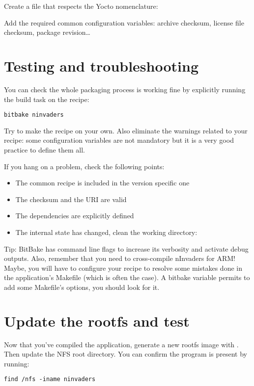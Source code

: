 Create a file that respects the Yocto nomenclature: 

Add the required common configuration variables: archive checksum, license file
checksum, package revision\dots

\section{Testing and troubleshooting}

You can check the whole packaging process is working fine by explicitly running
the build task on the  recipe:
\begin{verbatim}
bitbake ninvaders
\end{verbatim}

Try to make the recipe on your own. Also eliminate the warnings related to your
recipe: some configuration variables are not mandatory but it is a very good
practice to define them all.

If you hang on a problem, check the following points:
\begin{itemize}
  \item The common recipe is included in the version specific one
  \item The checksum and the URI are valid
  \item The dependencies are explicitly defined
  \item The internal state has changed, clean the working directory: \\
\end{itemize}

Tip: BitBake has command line flags to increase its verbosity and activate debug
outputs. Also, remember that you need to cross-compile nInvaders for ARM! Maybe,
you will have to configure your recipe to resolve some mistakes done in the
application's Makefile (which is often the case). A bitbake variable permits
to add some Makefile's options, you should look for it.

\section{Update the rootfs and test}

Now that you've compiled the  application, generate a new
rootfs image with . Then update the
NFS root directory. You can confirm the  program is
present by running:
\begin{verbatim}
find /nfs -iname ninvaders
\end{verbatim}

